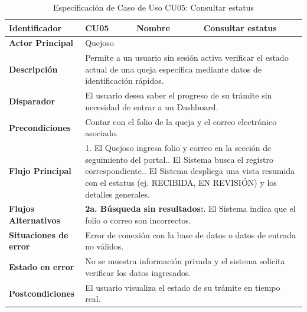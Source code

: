 \vspace{0.8cm}

\begingroup
\setlength{\parskip}{0pt}
\begin{longtable}{|p{3.5cm}|p{2cm}|p{2.5cm}|p{7cm}|}
\caption{Especificación de Caso de Uso CU05: Consultar estatus}
\label{tab:cu05_consultar_estatus} \\
\hline
\textbf{Identificador} & CU05 & \textbf{Nombre} & Consultar estatus \\ \hline
\textbf{Actor Principal} & \multicolumn{3}{p{11.5cm}|}{Quejoso} \\ \hline
\textbf{Descripción} & \multicolumn{3}{p{11.5cm}|}{Permite a un usuario sin sesión activa verificar el estado actual de una queja específica mediante datos de identificación rápidos.} \\ \hline
\textbf{Disparador} & \multicolumn{3}{p{11.5cm}|}{El usuario desea saber el progreso de su trámite sin necesidad de entrar a un Dashboard.} \\ \hline
\textbf{Precondiciones} & \multicolumn{3}{p{11.5cm}|}{Contar con el folio de la queja y el correo electrónico asociado.} \\ \hline
\textbf{Flujo Principal} & \multicolumn{3}{p{11.5cm}|}{1. El Quejoso ingresa folio y correo en la sección de seguimiento del portal.\newline 2. El Sistema busca el registro correspondiente.\newline 3. El Sistema despliega una vista resumida con el estatus (ej. RECIBIDA, EN REVISIÓN) y los detalles generales.} \\ \hline
\textbf{Flujos Alternativos} & \multicolumn{3}{p{11.5cm}|}{\textbf{2a. Búsqueda sin resultados:}\newline 1. El Sistema indica que el folio o correo son incorrectos.} \\ \hline
\textbf{Situaciones de error} & \multicolumn{3}{p{11.5cm}|}{Error de conexión con la base de datos o datos de entrada no válidos.} \\ \hline
\textbf{Estado en error} & \multicolumn{3}{p{11.5cm}|}{No se muestra información privada y el sistema solicita verificar los datos ingresados.} \\ \hline
\textbf{Postcondiciones} & \multicolumn{3}{p{11.5cm}|}{El usuario visualiza el estado de su trámite en tiempo real.} \\ \hline
\end{longtable}
\endgroup

\vspace{0.8cm}

